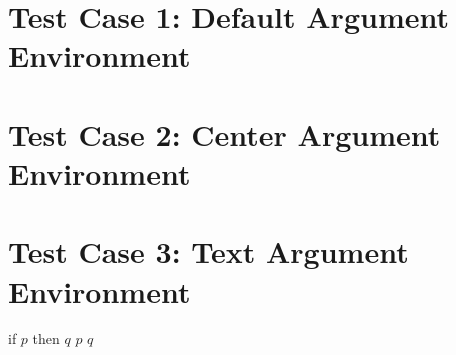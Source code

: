 \documentclass{article}
\begin{document}
\section{Test Case 1: Default Argument Environment}
\begin{argument}
\end{argument}

\section{Test Case 2: Center Argument Environment}
\begin{center}
    \begin{argument}
    \end{argument}
\end{center}

\section{Test Case 3: Text Argument Environment}
\begin{textargument}
    \textpremise if $p$ then $q$
    \textpremise $p$
    \textconclusion $q$
\end{textargument}
    
\end{document}
